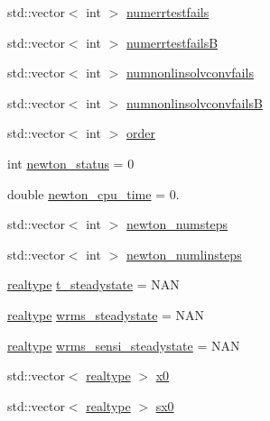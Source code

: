 \begin{DoxyCompactItemize}
\item 
std\+::vector$<$ int $>$ \mbox{\hyperlink{classamici_1_1_return_data_aea0bfe23fb5971a5348a3d017a859488}{numerrtestfails}}
\item 
std\+::vector$<$ int $>$ \mbox{\hyperlink{classamici_1_1_return_data_a894f4cf4dbdd38dda12c5730fb04482d}{numerrtestfailsB}}
\item 
std\+::vector$<$ int $>$ \mbox{\hyperlink{classamici_1_1_return_data_a67818adc34db21fb3d78731c0e60462a}{numnonlinsolvconvfails}}
\item 
std\+::vector$<$ int $>$ \mbox{\hyperlink{classamici_1_1_return_data_a9150501f058304e49bb6a52152cc9550}{numnonlinsolvconvfailsB}}
\item 
std\+::vector$<$ int $>$ \mbox{\hyperlink{classamici_1_1_return_data_a75a1634d2dab77d47af4eb58e6dc965e}{order}}
\item 
int \mbox{\hyperlink{classamici_1_1_return_data_a7a12031049f81ccdd4496bd4506c6d28}{newton\+\_\+status}} = 0
\item 
double \mbox{\hyperlink{classamici_1_1_return_data_a848d9dd3e74e2a55652ae304ac18687c}{newton\+\_\+cpu\+\_\+time}} = 0.
\item 
std\+::vector$<$ int $>$ \mbox{\hyperlink{classamici_1_1_return_data_ae8d9136bb7510303556f9935a15b9318}{newton\+\_\+numsteps}}
\item 
std\+::vector$<$ int $>$ \mbox{\hyperlink{classamici_1_1_return_data_a08ca5d9be9ff8f50955327334e5e87bb}{newton\+\_\+numlinsteps}}
\item 
\mbox{\hyperlink{namespaceamici_a1bdce28051d6a53868f7ccbf5f2c14a3}{realtype}} \mbox{\hyperlink{classamici_1_1_return_data_ae6c276c43addc2845ce72e7188924cc4}{t\+\_\+steadystate}} = N\+AN
\item 
\mbox{\hyperlink{namespaceamici_a1bdce28051d6a53868f7ccbf5f2c14a3}{realtype}} \mbox{\hyperlink{classamici_1_1_return_data_ad044a0dd6c510ee74c8122767c25d6cb}{wrms\+\_\+steadystate}} = N\+AN
\item 
\mbox{\hyperlink{namespaceamici_a1bdce28051d6a53868f7ccbf5f2c14a3}{realtype}} \mbox{\hyperlink{classamici_1_1_return_data_ae10f7eece540838884f18b379083fc8f}{wrms\+\_\+sensi\+\_\+steadystate}} = N\+AN
\item 
std\+::vector$<$ \mbox{\hyperlink{namespaceamici_a1bdce28051d6a53868f7ccbf5f2c14a3}{realtype}} $>$ \mbox{\hyperlink{classamici_1_1_return_data_a9089beccffa9671a052e3065166dce53}{x0}}
\item 
std\+::vector$<$ \mbox{\hyperlink{namespaceamici_a1bdce28051d6a53868f7ccbf5f2c14a3}{realtype}} $>$ \mbox{\hyperlink{classamici_1_1_return_data_a83cf74df5a7fee8ee66f882b898e7b63}{sx0}}

\end{DoxyCompactItemize}
